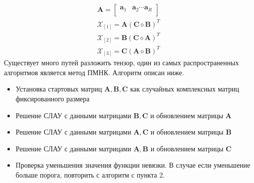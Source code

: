 \begin{align}
\mathbf{A}=\begin{bmatrix}
\mathbf{a}_1&\mathbf{a}_2\cdots \mathbf{a}_R\\
\end{bmatrix}
\label{i_9}
\end{align}
\begin{align}
\mathcal{X}_{[1]}=\mathbf{A}(\mathbf{C}\diamond \mathbf{B})^T
\label{i_10}
\end{align}
\begin{align}
\mathcal{X}_{[2]}=\mathbf{B}(\mathbf{C}\diamond \mathbf{A})^T
\label{i_11}
\end{align}
\begin{align}
\mathcal{X}_{[3]}=\mathbf{C}(\mathbf{A}\diamond \mathbf{B})^T
\label{i_12}
\end{align}
Существует много путей разложить тензор, один из самых распространенных алгоритмов является метод ПМНК. Алгоритм описан ниже\cite{Book66}.
\begin{itemize}
\item Установка стартовых матриц $\mathbf{A,B,C}$ как случайных комплексных матриц фиксированного размера
\item  Решение СЛАУ с данными матрицами $\mathbf{B,C}$ и обновлением матрицы $\mathbf{A}$ 
\item Решение СЛАУ с данными матрицами $\mathbf{A,C}$ и обновлением матрицы $\mathbf{B}$ 
\item Решение СЛАУ с данными матрицами $\mathbf{A,B}$ и обновлением матрицы $\mathbf{C}$ 
\item Проверка уменьшения значения функции невязки. В случае если уменьшение больше порога, повторить с алгоритм с пункта 2.
\end{itemize}

